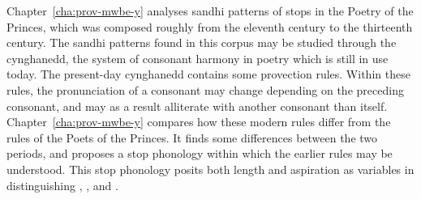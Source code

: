 Chapter~\ref{cha:prov-mwbe-y} analyses \gls{sandhi} patterns of stops in the Poetry of the Princes, which was composed roughly from the eleventh century to the thirteenth century. The \gls{sandhi} patterns found in this corpus  may be studied through the cynghanedd, the system of consonant harmony in poetry which is still in use today. The present-day cynghanedd  contains some provection rules. Within these rules, the pronunciation of a consonant may change depending on the preceding consonant, and may as a result alliterate with another consonant than itself. Chapter~\ref{cha:prov-mwbe-y} compares how these modern rules differ from the rules of the Poets of the Princes. It finds some differences between the two periods, and proposes a stop phonology within which the earlier rules may be understood. This stop phonology posits both length and aspiration as variables in distinguishing \xT, \lT, and \xD.



